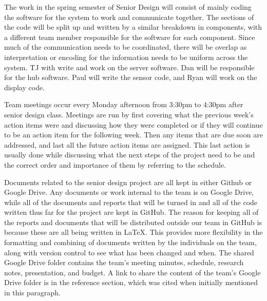 \documentclass[PPFS.tex]{template/subfiles}
\begin{document}
	The work in the spring semester of Senior Design will consist of mainly coding the software for the system to work and communicate together. The sections of the code will be split up and written by a similar breakdown in components, with a different team member responsible for the software for each component. Since much of the communication needs to be coordinated, there will be overlap as interpretation or encoding for the information needs to be uniform across the system. TJ with write and work on the server software. Dan will be responsible for the hub software. Paul will write the sensor code, and Ryan will work on the display code. 

	Team meetings occur every Monday afternoon from 3:30pm to 4:30pm after senior design class. Meetings are run by first covering what the previous week's action items were and discussing how they were completed or if they will continue to be an action item for the following week. Then any items that are due soon are addressed, and last all the future action items are assigned. This last action is usually done while discussing what the next steps of the project need to be and the correct order and importance of them by referring to the schedule.

	Documents related to the senior design project are all kept in either Github or Google Drive\cite{Google Drive}. Any documents or work internal to the team is on Google Drive, while all of the documents and reports that will be turned in and all of the code written thus far for the project are kept in GitHub. The reason for keeping all of the reports and documents that will be distributed outside our team in GitHub is because these are all being written in \LaTeX. This provides more flexibility in the formatting and combining of documents written by the individuals on the team, along with version control to see what has been changed and when. The shared Google Drive folder contains the team's meeting minutes, schedule, research notes, presentation, and budget. A link to share the content of the team's Google Drive folder is in the reference section, which was cited when initially mentioned in this paragraph. 
	
\end{document}
